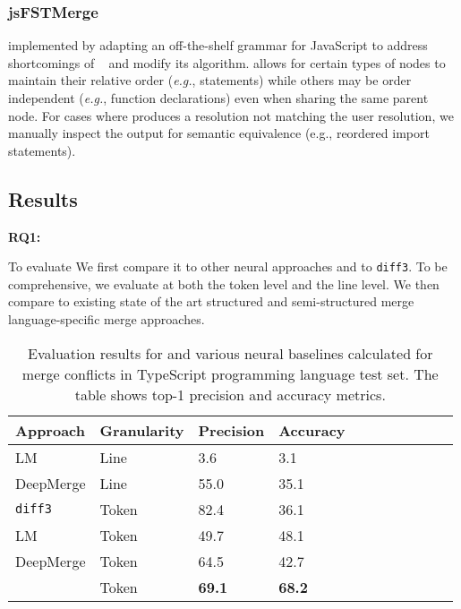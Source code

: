 \subsubsection{jsFSTMerge}
\citet{tavares2019javascript} implemented \jsfstmerge{} by adapting an off-the-shelf grammar for JavaScript to address shortcomings of \fstmerge{}~\cite{apel2012fstmerge} and modify its algorithm.
\jsfstmerge{} allows for certain types of nodes to maintain their relative order (\emph{e.g.}, statements) while others may be order independent (\emph{e.g.}, function declarations) even when sharing the same parent node.
For cases where \jsfstmerge{} produces a resolution not matching the user resolution, we manually inspect the output for semantic equivalence (e.g., reordered import statements).

\subsection{Results}
\label{sec:eval}


\noindent \textbf{RQ\scriptsize{1}: }\textbf{\rqOne}

To evaluate \thistool{} We first compare it to other neural approaches and to \texttt{diff3}. 
To be comprehensive, we evaluate at both the token level and the line level.  
We then compare \thistool{} to existing state of the art structured and semi-structured merge language-specific merge approaches.

\begin{table}[htb]
\small
\caption{Evaluation results for \thistool{} and various neural baselines calculated for merge conflicts in TypeScript programming language test set. The table shows top-1 precision and accuracy metrics.}
\centering
\begin{tabular}{lllllllllll} \toprule
\textbf{Approach}  & \textbf{Granularity} & {\textbf{Precision}} & {\textbf{Accuracy}} \\ \midrule
LM   & Line  &3.6 & 3.1 \\      %
DeepMerge & Line  & 55.0 & 35.1  \\ %
\midrule
\texttt{diff3} & Token & 82.4 & 36.1  \\
\midrule
LM & Token  & 49.7  & 48.1    \\      %
DeepMerge & Token  & 64.5 & 42.7 \\ %
\thistool{} & Token  & \textbf{69.1} & \textbf{68.2}  \\  
\bottomrule   
\end{tabular}
\label{tab:baselines_left}
\end{table}




